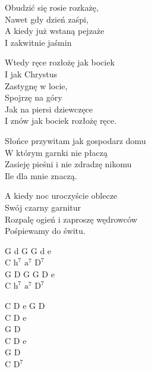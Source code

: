\begin{textn}
    Obudzić się rosie rozkażę,\\
    Nawet gdy dzień zaśpi,\\
    A kiedy już wstaną pejzaże\\
    I zakwitnie jaśmin

    \vin Wtedy ręce rozłożę jak bociek\\
    \vin I jak Chrystus\\
    \vin Zastygnę w locie,\\
    \vin Spojrzę na góry\\
    \vin Jak na piersi dziewczęce\\
    \vin I znów jak bociek rozłożę ręce.

    Słońce przywitam jak gospodarz domu\\
    W którym garnki nie płaczą\\
    Zasieję pieśni i nie zdradzę nikomu\\
    Ile dla mnie znaczą.

    A kiedy noc uroczyście oblecze\\
    Swój czarny garnitur\\
    Rozpalę ogień i zaproszę wędrowców\\
    Pośpiewamy do świtu.
\end{textn}
\begin{chordw}
    G d G G d e\\
    C $\mathrm{h^7}$ $\mathrm{a^7}$ $\mathrm{D^7}$\\
    G D G G D e\\
    C $\mathrm{h^7}$ $\mathrm{a^7}$ $\mathrm{D^7}$

    C D e G D\\
    C D e\\
    G D\\
    C D e\\
    G D\\
    C $\mathrm{D^7}$
\end{chordw}
